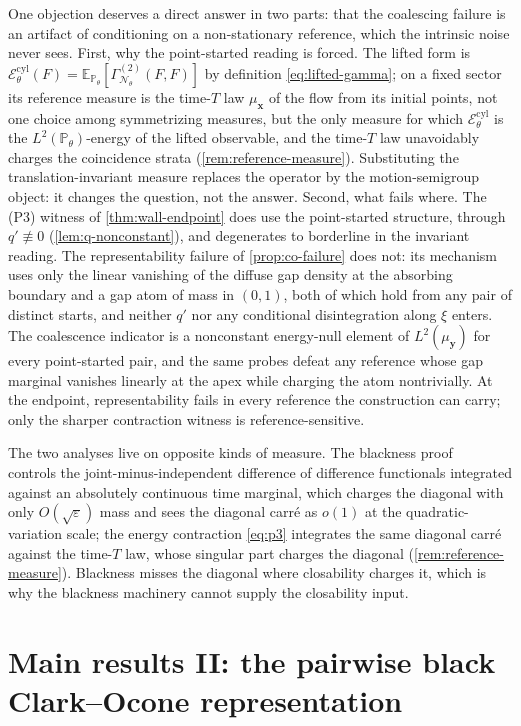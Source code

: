 \documentclass[reqno,final,11pt]{amsart}
\theoremstyle{plain}
\theoremstyle{definition}
\theoremstyle{remark}
\newcommand{\E}{\mathbb E}
\newcommand{\Prob}{\mathbb P}
\newcommand{\cE}{\mathcal E}
\newcommand{\cN}{\mathcal N}
\newcommand{\GamN}{\Gamma^{(2)}_{\cN_\theta}}
\newcommand{\Pth}{\Prob_{\theta}}
\newcommand{\Ecyl}{\cE^{\mathrm{cyl}}_{\theta}}
\begin{document}
One objection deserves a direct answer in two parts: that the coalescing
failure is an artifact of conditioning on a non-stationary reference, which
the intrinsic noise never sees. First, why the point-started reading is
forced. The lifted form is $\Ecyl(F)=\E_{\Pth}[\GamN(F,F)]$ by definition
\eqref{eq:lifted-gamma}; on a fixed sector its reference measure is the
time-$T$ law $\mu_{\mathbf x}$ of the flow from its initial points, not one
choice among symmetrizing measures, but the only measure for which $\Ecyl$ is
the $L^2(\Pth)$-energy of the lifted observable, and the time-$T$ law
unavoidably charges the coincidence strata
(\cref{rem:reference-measure}). Substituting the translation-invariant measure
replaces the operator by the motion-semigroup object: it changes the question,
not the answer. Second, what fails where. The \textnormal{(P3)} witness of
\cref{thm:wall-endpoint} does use the point-started structure, through
$q'\not\equiv0$ (\cref{lem:q-nonconstant}), and degenerates to borderline in
the invariant reading. The representability failure of \cref{prop:co-failure}
does not: its mechanism uses only the linear vanishing of the diffuse
gap density at the absorbing boundary and a gap atom of mass in $(0,1)$, both
of which hold from any pair of distinct starts, and neither $q'$ nor any
conditional disintegration along $\xi$ enters. The coalescence indicator is a
nonconstant energy-null element of $L^2(\mu_{\mathbf y})$ for every
point-started pair, and the same probes defeat any reference whose gap
marginal vanishes linearly at the apex while charging the atom nontrivially.
At the endpoint, representability fails in every reference the construction
can carry; only the sharper contraction witness is reference-sensitive.

The two analyses live on opposite kinds of measure. The blackness
proof~\citep{LJR-circle-noise} controls the joint-minus-independent difference of
difference functionals integrated against an absolutely continuous time marginal,
which charges the diagonal with only $O(\sqrt\varepsilon)$ mass and sees the
diagonal carr\'e as $o(1)$ at the quadratic-variation scale; the energy
contraction \eqref{eq:p3} integrates the same diagonal carr\'e against the
time-$T$ law, whose singular part charges the diagonal
(\cref{rem:reference-measure}). Blackness misses the diagonal where closability
charges it, which is why the blackness machinery cannot supply the closability
input.

\section{Main results II: the pairwise black Clark--Ocone representation}\label{sec:clarkocone}
\end{document}
